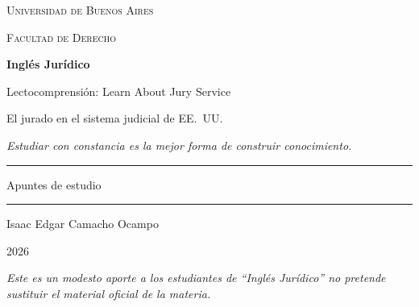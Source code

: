\documentclass[12pt,oneside]{book}
\newcommand{\universidad}{Universidad de Buenos Aires}
\newcommand{\facultad}{Facultad de Derecho}
\newcommand{\materia}{Inglés Jurídico}
\newcommand{\titulo}{Lectocomprensión: Learn About Jury Service}
\newcommand{\subtitulo}{El jurado en el sistema judicial de EE.~UU.}
\newcommand{\autor}{Isaac Edgar Camacho Ocampo}
\newcommand{\anio}{2026}
\begin{document}
\begin{titlepage}

\thispagestyle{empty}

\begin{center}

\vspace*{1cm}

{\large \textsc{\universidad}}

\vspace{0.2cm}

{\large \textsc{\facultad}}

\vspace{3cm}

{\Huge \textbf{\materia}}

\vspace{1cm}

{\LARGE \titulo}

\vspace{0.4cm}

{\large \subtitulo}

\vspace{0.8cm}

\textit{Estudiar con constancia es la mejor forma de construir conocimiento.}

\vspace{1.2cm}

\rule{0.70\textwidth}{0.5pt}

\vspace{0.5cm}

{\large Apuntes de estudio}

\vspace{0.5cm}

\rule{0.70\textwidth}{0.5pt}

\vfill

{\large \autor}

\vspace{0.3cm}

{\large \anio}

\end{center}

\vfill

\begin{flushleft}
\textit{Este es un modesto aporte a los estudiantes de ``Inglés Jurídico'' no pretende sustituir el material oficial de la materia.}
\end{flushleft}

\end{titlepage}

\frontmatter
\tableofcontents
\mainmatter
\end{document}
